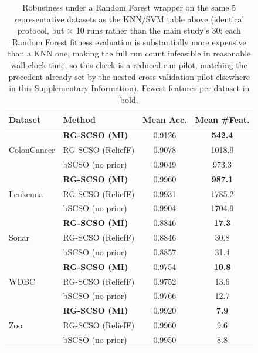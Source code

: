 \documentclass[9pt]{article}
\begin{document}
\begin{table}[t]
\centering
\caption{Robustness under a Random Forest wrapper on the same 5 representative datasets as the KNN/SVM table above (identical protocol, but $\times$ 10 runs rather than the main study's 30: each Random Forest fitness evaluation is substantially more expensive than a KNN one, making the full run count infeasible in reasonable wall-clock time, so this check is a reduced-run pilot, matching the precedent already set by the nested cross-validation pilot elsewhere in this Supplementary Information). Fewest features per dataset in bold.}
\label{tab:rfrobust}
\footnotesize
\begin{tabular}{llcc}
\toprule
Dataset & Method & Mean Acc. & Mean \#Feat. \\
\midrule
\multirow{3}{*}{ColonCancer} & \textbf{RG-SCSO (MI)} & 0.9126 & \textbf{542.4} \\
 & RG-SCSO (ReliefF) & 0.9078 & 1018.9 \\
 & bSCSO (no prior) & 0.9049 & 973.3 \\
\midrule
\multirow{3}{*}{Leukemia} & \textbf{RG-SCSO (MI)} & 0.9960 & \textbf{987.1} \\
 & RG-SCSO (ReliefF) & 0.9931 & 1785.2 \\
 & bSCSO (no prior) & 0.9904 & 1704.9 \\
\midrule
\multirow{3}{*}{Sonar} & \textbf{RG-SCSO (MI)} & 0.8846 & \textbf{17.3} \\
 & RG-SCSO (ReliefF) & 0.8846 & 30.8 \\
 & bSCSO (no prior) & 0.8857 & 31.4 \\
\midrule
\multirow{3}{*}{WDBC} & \textbf{RG-SCSO (MI)} & 0.9754 & \textbf{10.8} \\
 & RG-SCSO (ReliefF) & 0.9752 & 13.6 \\
 & bSCSO (no prior) & 0.9766 & 12.7 \\
\midrule
\multirow{3}{*}{Zoo} & \textbf{RG-SCSO (MI)} & 0.9920 & \textbf{7.9} \\
 & RG-SCSO (ReliefF) & 0.9960 & 9.6 \\
 & bSCSO (no prior) & 0.9950 & 8.8 \\
\bottomrule
\end{tabular}
\end{table}


\FloatBarrier
\end{document}
